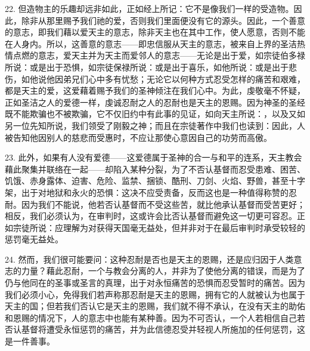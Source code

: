 22. 但造物主的乐趣却远非如此，正如经上所记：它不是像我们一样的受造物。因此，除非从那里赐予我们祂的爱，否则我们里面便没有它的源头。因此，一个善意的意志，即我们藉以爱天主的意志，除非天主也在其中工作，使人愿意，否则不能在人身内。所以，这善意的意志——即忠信服从天主的意志，被来自上界的圣洁热情点燃的意志，爱天主并为天主而爱邻人的意志——无论是出于爱，如宗徒伯多禄所说：或是出于恐惧，如宗徒保禄所说：或是出于喜乐，如他所说：或是出于悲伤，如他说他因弟兄们心中多有忧愁；无论它以何种方式忍受怎样的痛苦和艰难，都是天主的爱，这爱藉着赐予我们的圣神倾注在我们心中。为此，虔敬毫不怀疑，正如圣洁之人的爱德一样，虔诚忍耐之人的忍耐也是天主的恩赐。因为神圣的圣经既不能欺骗也不被欺骗，它不仅旧约中有此事的见证，如向天主所说：，以及又如另一位先知所说，我们领受了刚毅之神；而且在宗徒著作中我们也读到：因此，人被告知他因别人的慈悲而受惠时，不应让那使心意因自己的功劳而高傲。\par

23. 此外，如果有人没有爱德——这爱德属于圣神的合一与和平的连系，天主教会藉此聚集并联络在一起——却陷入某种分裂，为了不否认基督而忍受患难、困苦、饥饿、赤身露体、迫害、危险、监禁、捆锁、酷刑、刀剑、火焰、野兽，甚至十字架，出于对地狱和永火的恐惧：这决不应受责备，反而这也是一种值得称赞的忍耐。因为我们不能说，他若否认基督而不受这些苦，就比他承认基督而受苦更好；相反，我们必须认为，在审判时，这或许会比否认基督而避免这一切更可容忍。正如宗徒所说：应理解为对获得天国毫无益处，但并非对于在最后审判时承受较轻的惩罚毫无益处。\par

24. 然而，我们很可能要问：这种忍耐是否也是天主的恩赐，还是应归因于人类意志的力量？藉此忍耐，一个与教会分离的人，并非为了使他分离的错误，而是为了仍与他同在的圣事或圣言的真理，出于对永恒痛苦的恐惧而忍受暂时的痛苦。因为我们必须小心，免得我们若声称那忍耐是天主的恩赐，拥有它的人就被认为也属于天主的国；但若我们否认它是天主的恩赐，我们就不得不承认，在没有天主的助佑和恩赐的情况下，人的意志中也能有某种善。因为不可否认，一个人若相信自己若否认基督将遭受永恒惩罚的痛苦，并为此信德忍受并轻视人所施加的任何惩罚，这是一件善事。\par


